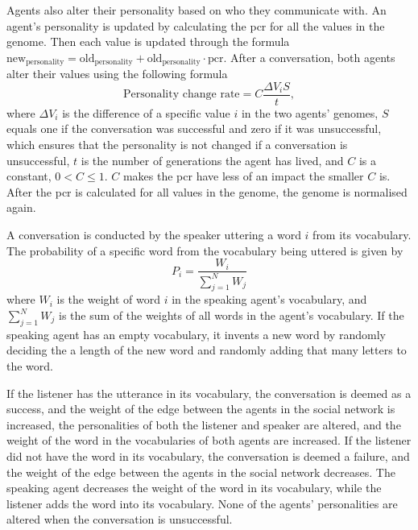 Agents also alter their personality based on who they communicate with. An agent's personality is updated by calculating the \ac{pcr} for all the values in the genome. Then each value is updated through the formula $\mathrm{new_{personality}} = \mathrm{old_{personality}} + \mathrm{old_{personality}} \cdot \mathrm{pcr}$. After a conversation, both agents alter their values using the following formula
\begin{equation}\label{eq:PCR}
\text{Personality change rate} = C\frac{\Delta V_i S}{t},
\end{equation}
where $\Delta V_i$ is the difference of a specific value $i$ in the two agents' genomes, $S$ equals one if the conversation was successful and zero if it was unsuccessful, which ensures that the personality is not changed if a conversation is unsuccessful, $t$ is the number of generations the agent has lived, and $C$ is a constant, $0 < C \leq 1$. $C$ makes the \ac{pcr} have less of an impact the smaller $C$ is. After the \ac{pcr} is calculated for all values in the genome, the genome is normalised again.

A conversation is conducted by the speaker uttering a word $i$ from its vocabulary. The probability of a specific word from the vocabulary being uttered is given by
\begin{equation}\label{eq:chooseWordprob}
P_{i} = \frac{W_{i}}{\sum_{j=1}^{N}W_{j}}
\end{equation}
where $W_{i}$ is the weight of word $i$ in the speaking agent's vocabulary, and $\sum_{j=1}^{N}W_{j}$ is the sum of the weights of all words in the agent's vocabulary. If the speaking agent has an empty vocabulary, it invents a new word by randomly deciding the a length of the new word and randomly adding that many letters to the word. 

If the listener has the utterance in its vocabulary, the conversation is deemed as a success, and the weight of the edge between the agents in the social network is increased, the personalities of both the listener and speaker are altered, and the weight of the word in the vocabularies of both agents are increased. If the listener did not have the word in its vocabulary, the conversation is deemed a failure, and the weight of the edge between the agents in the social network decreases. The speaking agent decreases the weight of the word in its vocabulary, while the listener adds the word into its vocabulary. None of the agents' personalities are altered when the conversation is unsuccessful. 

